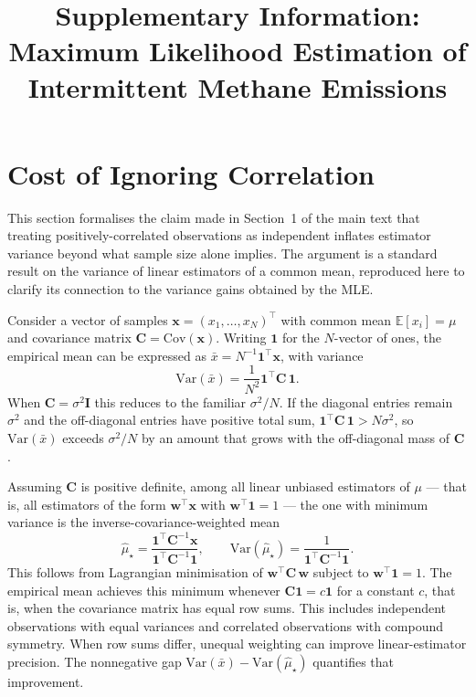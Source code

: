 \documentclass[11pt]{article}
\title{Supplementary Information:\\Maximum Likelihood Estimation of Intermittent Methane Emissions}
\author{}
\date{}
\newcommand{\new}[1]{#1}
\newcommand{\Var}{\mathrm{Var}}
\begin{document}
\maketitle

{\small\tableofcontents}
\newpage

\section{Cost of Ignoring Correlation}
\label{sec:corr_mean_SI}

\new{This section formalises the claim made in Section~1 of the main text that treating positively-correlated observations as independent inflates estimator variance beyond what sample size alone implies. The argument is a standard result on the variance of linear estimators of a common mean, reproduced here to clarify its connection to the variance gains obtained by the MLE.}

\new{Consider a vector of samples $\mathbf{x} = (x_1, \ldots, x_N)^\top$ with common mean $\mathbb{E}[x_i] = \mu$ and covariance matrix $\mathbf{C} = \mathrm{Cov}(\mathbf{x})$. Writing $\mathbf{1}$ for the $N$-vector of ones, the empirical mean can be expressed as $\bar x = N^{-1} \mathbf{1}^\top \mathbf{x}$, with variance
\begin{equation}
    \Var(\bar x) = \frac{1}{N^2} \mathbf{1}^\top \mathbf{C}\, \mathbf{1}.
\end{equation}
When $\mathbf{C} = \sigma^2 \mathbf{I}$ this reduces to the familiar $\sigma^2/N$. If the diagonal entries remain $\sigma^2$ and the off-diagonal entries have positive total sum, $\mathbf{1}^\top \mathbf{C}\, \mathbf{1} > N \sigma^2$, so $\Var(\bar x)$ exceeds $\sigma^2/N$ by an amount that grows with the off-diagonal mass of $\mathbf{C}$.}

\new{Assuming $\mathbf C$ is positive definite, among all linear unbiased estimators of $\mu$ — that is, all estimators of the form $\mathbf{w}^\top \mathbf{x}$ with $\mathbf{w}^\top \mathbf{1} = 1$ — the one with minimum variance is the inverse-covariance-weighted mean
\begin{equation}
    \hat\mu_\star
    = \frac{\mathbf{1}^\top \mathbf{C}^{-1} \mathbf{x}}{\mathbf{1}^\top \mathbf{C}^{-1} \mathbf{1}},
    \qquad
    \Var(\hat\mu_\star) = \frac{1}{\mathbf{1}^\top \mathbf{C}^{-1} \mathbf{1}}.
    \label{eq:gls_SI}
\end{equation}
This follows from Lagrangian minimisation of $\mathbf{w}^\top \mathbf{C}\, \mathbf{w}$ subject to $\mathbf{w}^\top \mathbf{1} = 1$. The empirical mean achieves this minimum whenever $\mathbf C\mathbf 1=c\mathbf 1$ for a constant $c$, that is, when the covariance matrix has equal row sums. This includes independent observations with equal variances and correlated observations with compound symmetry. When row sums differ, unequal weighting can improve linear-estimator precision. The nonnegative gap $\Var(\bar x)-\Var(\hat\mu_\star)$ quantifies that improvement.}
\end{document}
